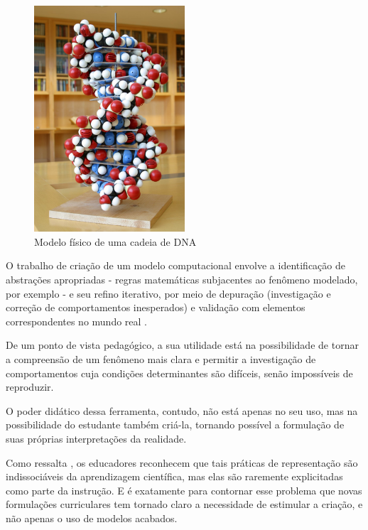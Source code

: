 \begin{figure}[!htb]
  \caption{Modelo físico de uma cadeia de DNA}
	\begin{center}
    \includegraphics[width=0.5\textwidth]{imagens/modelo_fisico.jpg}
	\end{center}
	\label{fig:modelo-fisico}
\end{figure}

O trabalho de criação de um modelo computacional envolve a identificação de abstrações apropriadas - regras matemáticas subjacentes ao fenômeno modelado, por exemplo - e seu refino iterativo, por meio de depuração (investigação e correção de comportamentos inesperados) e validação com elementos correspondentes no mundo real \cite{wing2008}.

De um ponto de vista pedagógico, a sua utilidade está na possibilidade de tornar a compreensão de um fenômeno mais clara e permitir a investigação de comportamentos cuja condições determinantes são difíceis, senão impossíveis de reproduzir.

O poder didático dessa ferramenta, contudo, não está apenas no seu uso, mas na possibilidade do estudante também criá-la, tornando possível a formulação de suas próprias interpretações da realidade. 

Como ressalta , os educadores reconhecem que tais práticas de representação são indissociáveis da aprendizagem científica, mas elas são raremente explicitadas como parte da instrução. E é exatamente para contornar esse problema que novas formulações curriculares tem tornado claro a necessidade de estimular a criação, e não apenas o uso de modelos acabados. 

